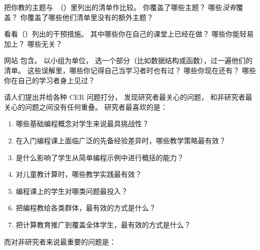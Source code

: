 把你教的主题与~\cite{Luxt2017}（）里列出的清单作比较。
你覆盖了哪些主题？
哪些\emph{没有}覆盖？
你覆盖了哪些他们清单里没有的额外主题？


看看\cite{Viha2014}（）列出的干预措施。
其中哪些你在自己的课堂上已经在做？
哪些你能轻易加上？
哪些无关？


网站
包含。
以小组为单位，
选一个部分（比如数据结构或函数），过一遍他们的清单。
这些误解里，哪些你记得自己当学习者时也有过？
哪些你现在还有？
哪些你在自己的学习者身上见过？


\cite{Denn2019}请人们提出并给各种 CER 问题打分，
发现研究者最关心的问题，
和非研究者最关心的问题之间没有任何重叠。
研究者最喜欢的是：

\begin{enumerate}

\item
  哪些基础编程概念对学生来说最具挑战性？

\item
  在入门编程课上面临广泛的先备经验差异时，哪些教学策略最有效？

\item
  是什么影响了学生从简单编程示例中进行概括的能力？

\item
  对儿童教计算时，哪些教学实践最有效？

\item
  编程课上的学生对哪类问题最投入？

\item
  把编程教给各类群体，最有效的方式是什么？

\item
  把计算教育推广到覆盖全体学生，最有效的方式是什么？

\end{enumerate}

\noindent
而对非研究者来说最重要的问题是：

